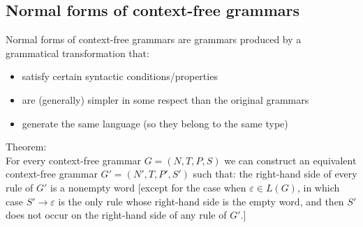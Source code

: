 \documentclass[margin=0px]{article}
\begin{document}
\subsection{Normal forms of context-free grammars}
Normal forms of context-free grammars are grammars produced by a grammatical transformation that:
\begin{itemize}
    \item satisfy certain syntactic conditions/properties
    \item are (generally) simpler in some respect than the original grammars
    \item generate the same language (so they belong to the same type)
\end{itemize}
Theorem:\\
For every context-free grammar $G = (N, T, P, S)$ we can construct an equivalent context-free grammar $G' = (N', T, P', S')$ such that: the right-hand side of every rule of $G'$ is a nonempty word [except for the case when $\varepsilon \in L(G)$, in which case $S' \rightarrow \varepsilon$ is the only rule whose right-hand side is the empty word, and then $S'$ does not occur on the right-hand side of any rule of $G'$.]
\end{document}
